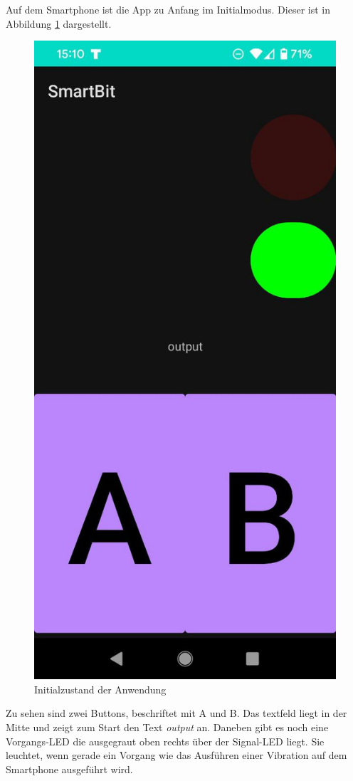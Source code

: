 \documentclass[11pt,a4paper]{report}
\begin{document}
Auf dem Smartphone ist die App zu Anfang im Initialmodus.
Dieser ist in Abbildung \ref{fig:initial_app} dargestellt.
\begin{figure}[htbp]
  \centering
  \includegraphics[height=0.4\textheight]{images/app_initial}
  \caption{Initialzustand der Anwendung}
  \label{fig:initial_app}
\end{figure}
Zu sehen sind zwei Buttons, beschriftet mit A und B.
Das textfeld liegt in der Mitte und zeigt zum Start den Text \textit{output} an.
Daneben gibt es noch eine Vorgangs-LED die ausgegraut oben rechts über der Signal-LED liegt.
Sie leuchtet, wenn gerade ein Vorgang wie das Ausführen einer Vibration auf dem Smartphone ausgeführt wird.
\end{document}

